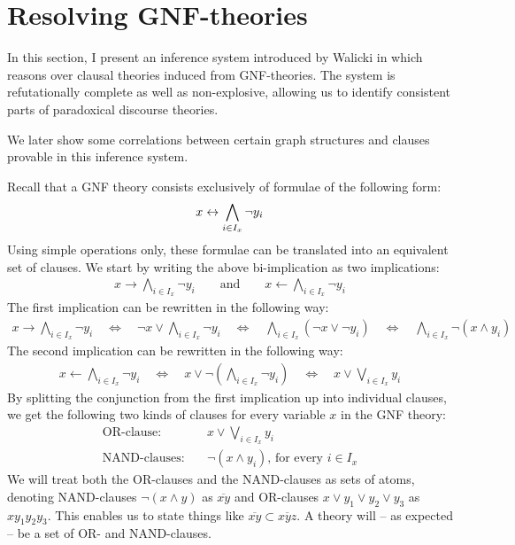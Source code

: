 

\section{Resolving GNF-theories}
\label{sec:Resolving GNF-theories}
In this section, I present an inference system introduced by Walicki in \cite{michal-completeness} which reasons over clausal theories induced from GNF-theories.
The system is refutationally complete as well as non-explosive, allowing us to identify consistent parts of paradoxical discourse theories.

We later show some correlations between certain graph structures and clauses provable in this inference system.

Recall that a GNF theory consists exclusively of formulae of the following form:
\begin{align}
  x \leftrightarrow \bigwedge_{i \in I_x} \neg y_i
\end{align}
Using simple operations only, these formulae can be translated into an equivalent set of clauses.
We start by writing the above bi-implication as two implications:
\begin{align}
  x \rightarrow \bigwedge_{i \in I_x} \neg y_i \quad\quad \text{and} \quad\quad x \leftarrow \bigwedge_{i \in I_x} \neg y_i
\end{align}
The first implication can be rewritten in the following way:
\begin{align}
  x \rightarrow \bigwedge_{i \in I_x} \neg y_i
  \quad\Leftrightarrow\quad \neg x \vee \bigwedge_{i \in I_x} \neg y_i
  \quad\Leftrightarrow\quad \bigwedge_{i \in I_x} (\neg x \vee \neg y_i)
  \quad\Leftrightarrow\quad \bigwedge_{i \in I_x} \neg (x \wedge y_i)
\end{align}
The second implication can be rewritten in the following way:
\begin{align}
  x \leftarrow \bigwedge_{i \in I_x} \neg y_i
  \quad\Leftrightarrow\quad x \vee \neg \left( \bigwedge_{i \in I_x} \neg y_i \right)
  \quad\Leftrightarrow\quad x \vee \bigvee_{i \in I_x} y_i
\end{align}
By splitting the conjunction from the first implication up into individual clauses, we get the following two kinds of clauses for every variable $x$ in the GNF theory:
\begin{align}
  \text{OR-clause:}&\quad x \vee \bigvee_{i \in I_x} y_i\\
  \text{NAND-clauses:}&\quad \neg (x \wedge y_i)\text{, for every }i \in I_x
\end{align}
We will treat both the OR-clauses and the NAND-clauses as sets of atoms, denoting NAND-clauses $\neg (x \wedge y)$ as $\overline{xy}$ and OR-clauses $x \vee y_1 \vee y_2 \vee y_3$ as $xy_1y_2y_3$.
This enables us to state things like $\overline{xy} \subset \overline{xyz}$.
A theory will -- as expected -- be a set of OR- and NAND-clauses.

